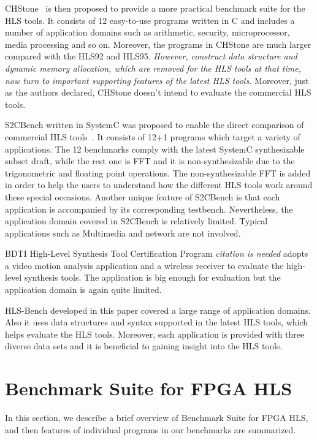 \documentclass[conference]{IEEEtran}
\begin{document}
CHStone~\cite{hara2008chstone} is then proposed to provide a more practical benchmark suite for the HLS tools. It consists of 12 easy-to-use programs written in C and includes a number of application domains such as arithmetic, security, microprocessor, media processing and so on. Moreover, the programs in CHStone are much larger compared with the HLS92 and HLS95. \emph{However, construct data structure and dynamic memory allocation, which are removed for the HLS tools at that time, now turn to important supporting features of the latest HLS tools.} Moreover, just as the authors declared, CHStone doesn't intend to evaluate the commercial HLS tools. 

S2CBench written in SystemC was proposed  to enable the direct comparison of commercial HLS tools~\cite{carrions2cbench}. It consists of 12+1 programs which target a variety of applications. The 12 benchmarks comply with the latest SystemC synthesizable subset draft, while the rest one is FFT and it is non-synthesizable due to the trigonometric and floating point operations. The non-synthesizable FFT is added in order to help the users to understand how the different HLS tools work around these special occasions. Another unique feature of S2CBench is that each application is accompanied by its corresponding testbench. Nevertheless, the application domain covered in S2CBench is relatively limited. Typical applications such as Multimedia and network are not involved. 

BDTI High-Level Synthesis Tool Certification Program \emph{citation is needed} adopts a video motion analysis application and a wireless receiver to evaluate the high-level synthesis tools. The application is big enough for evaluation but the application domain is again quite limited.  

HLS-Bench developed in this paper covered a large range of application domains. Also it uses data structures and syntax supported in the latest HLS tools, which helps evaluate the HLS tools. Moreover, each application is provided with three diverse data sets and it is beneficial to gaining insight into the HLS tools.  




\section{Benchmark Suite for FPGA HLS}\label{section_benchmark_suite}
In this section, we describe a brief overview of Benchmark Suite for FPGA HLS, and then features of individual programs in our benchmarks are summarized.
\end{document}
